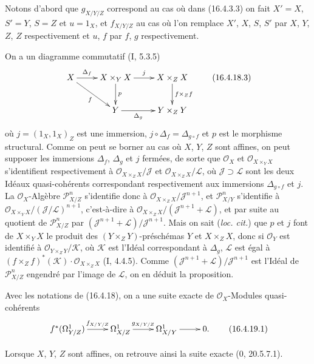 Notons d'abord que $g_{X/Y/Z}$ correspond au cas où dans (16.4.3.3) on fait
$X'=X$, $S'=Y$, $S=Z$ et $u=1_X$, et $f_{X/Y/Z}$ au cas où l'on remplace
$X'$, $X$, $S$, $S'$ par $X$, $Y$, $Z$, $Z$ respectivement et $u$, $f$ par
$f$, $g$ respectivement.

On a un diagramme commutatif (I, 5.3.5)
\[
  \xymatrix{
    X\ar[r]^-{\Delta_f}\ar[dr]_-f
      &X\times_Y X\ar[d]^-p\ar[r]^-j
      &X\times_Z X\ar[d]^-{f\times_Z f}\\
    &Y\ar[r]_-{\Delta_g}&Y\times_Z Y
  }
  \tag{16.4.18.3}
  \label{IV.16.4.18.3}
\]
où $j=(1_X,1_X)_Z$ est une immersion, $j\circ\Delta_f=\Delta_{g\circ f}$ et
$p$ est le morphisme structural. Comme on peut se borner au cas où $X$, $Y$,
$Z$ sont affines, on peut supposer les immersions $\Delta_f$, $\Delta_g$ et
$j$ fermées, de sorte que $\mathcal{O}_X$ et
$\mathcal{O}_{X\times_Y X}$ s'identifient respectivement à
$\mathcal{O}_{X\times_Z X}/\mathscr{J}$ et
$\mathcal{O}_{X\times_Z X}/\mathscr{L}$, où
$\mathscr{J}\supset\mathscr{L}$ sont les deux Idéaux quasi-cohérents
correspondant respectivement aux immersions $\Delta_{g\circ f}$ et $j$. La
$\mathcal{O}_X$-Algèbre $\mathscr{P}_{X/Z}^n$ s'identifie donc à
$\mathcal{O}_{X\times_Z X}/\mathscr{J}^{n+1}$, et
$\mathscr{P}_{X/Y}^n$ s'identifie à
$\mathcal{O}_{X\times_Y X}/(\mathscr{J}/\mathscr{L})^{n+1}$, c'est-à-dire à
$\mathcal{O}_{X\times_Z X}/(\mathscr{J}^{n+1}+\mathscr{L})$, et par suite au
quotient de $\mathscr{P}_{X/Z}^n$ par
$(\mathscr{J}^{n+1}+\mathscr{L})/\mathscr{J}^{n+1}$. Mais on sait
(\emph{loc. cit.}) que $p$ et $j$ font de $X\times_Y X$ le produit des
$(Y\times_Z Y)$-préschémas $Y$ et $X\times_Z X$, donc si $\mathcal{O}_Y$ est
identifié à $\mathcal{O}_{Y\times_Z Y}/\mathscr{K}$, où $\mathscr{K}$ est
l'Idéal correspondant à $\Delta_g$, $\mathscr{L}$ est égal à
$(f\times_Z f)^*(\mathscr{K})\cdot\mathcal{O}_{X\times_Z X}$ (I, 4.4.5).
Comme $(\mathscr{J}^{n+1}+\mathscr{L})/\mathscr{J}^{n+1}$ est l'Idéal de
$\mathscr{P}_{X/Z}^n$ engendré par l'image de $\mathscr{L}$, on en déduit la
proposition.

\begin{corollary}[16.4.19]
\label{IV.16.4.19}
Avec les notations de (16.4.18), on a une suite exacte de
$\mathcal{O}_X$-Modules quasi-cohérents
\[
  \xymatrix{
    f^*(\Omega_{Y/Z}^1)\ar[r]^-{f_{X/Y/Z}}&
    \Omega_{X/Z}^1\ar[r]^-{g_{X/Y/Z}}&
    \Omega_{X/Y}^1\ar[r]&0.
  }
  \tag{16.4.19.1}
  \label{IV.16.4.19.1}
\]
\end{corollary}

Lorsque $X$, $Y$, $Z$ sont affines, on retrouve ainsi la suite exacte
(0, 20.5.7.1).

